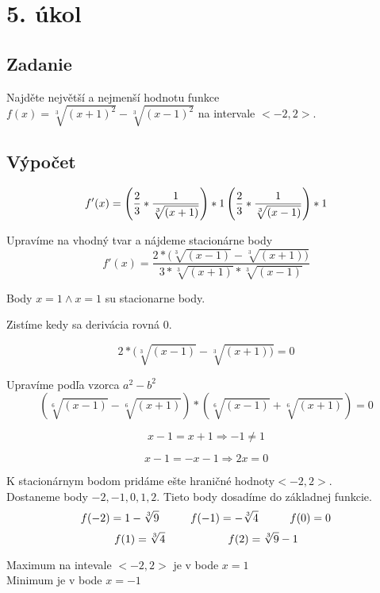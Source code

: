 \section{5. úkol}

\subsection{Zadanie}
 Najděte největší a nejmenší hodnotu funkce $f(x)=\sqrt[3]{(x+1)^2} -\sqrt[3]{(x-1)^2}$ na intervale $ <-2,2>$.
\subsection{Výpočet}
\begin{displaymath}
f'(x)=\left(\frac{2}{3}*\frac{1}{\sqrt[3]{(x+1)}}\right)*1\-\left(\frac{2}{3}*\frac{1}{\sqrt[3]{(x-1)}}\right)*1
\end{displaymath}

Upravíme na vhodný tvar a nájdeme stacionárne body
\begin{displaymath}
f'(x)=\frac{2*(\sqrt[3]{(x-1)}-\sqrt[3]{(x+1))}}{3*\sqrt[3]{(x+1)}*\sqrt[3]{(x-1)}}
\end{displaymath}

\begin{center}
Body $x=1 \wedge  x=1$ su stacionarne body.
\end{center}

Zistíme kedy sa derivácia rovná 0. 

\begin{displaymath}
2*(\sqrt[3]{(x-1)}-\sqrt[3]{(x+1))}=0
\end{displaymath}

Upravíme podľa vzorca $a^2-b^2$ \\
\begin{displaymath}
\left(\sqrt[6]{(x-1)}-\sqrt[6]{(x+1)}\right)*\left(\sqrt[6]{(x-1)}+\sqrt[6]{(x+1)}\right)=0 
\end{displaymath}

\begin{displaymath}
x-1=x+1 \Rightarrow -1\neq1 
\end{displaymath}

\begin{displaymath}
x-1=-x-1 \Rightarrow 2x=0
\end{displaymath}

K stacionárnym bodom pridáme ešte hraničné hodnoty$ <-2,2>$.\\
Dostaneme body $-2,-1,0,1,2$. Tieto body dosadíme do základnej funkcie.
\begin{displaymath}
f(-2)=1-\sqrt[3]{9} \hspace{10mm} f(-1)=-\sqrt[3]{4} \hspace{10mm}  f(0)=0 
\end{displaymath}
\begin{displaymath}
f(1)=\sqrt[3]{4} \hspace{20mm} f(2)=\sqrt[3]{9}-1
\end{displaymath}
\begin{center}
\large{Maximum na intevale $ <-2,2>$ je v bode $x=1$ \\
 Minimum je v bode $x=-1$}
\end{center}
